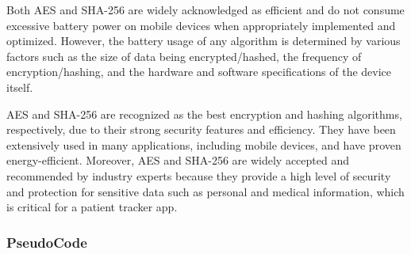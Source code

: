 \documentclass[12pt]{article}
\begin{document}
			Both AES and SHA-256 are widely acknowledged as efficient and do not consume excessive battery power on mobile devices when appropriately implemented and optimized. However, the battery usage of any algorithm is determined by various factors such as the size of data being encrypted/hashed, the frequency of encryption/hashing, and the hardware and software specifications of the device itself.
			
			AES and SHA-256 are recognized as the best encryption and hashing algorithms, respectively, due to their strong security features and efficiency. They have been extensively used in many applications, including mobile devices, and have proven energy-efficient. Moreover, AES and SHA-256 are widely accepted and recommended by industry experts because they provide a high level of security and protection for sensitive data such as personal and medical information, which is critical for a patient tracker app.
			
			
			\subsubsection{PseudoCode}
			
\end{document}
